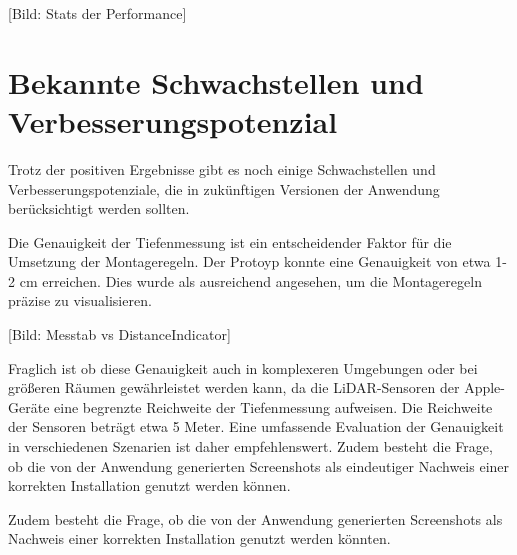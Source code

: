 [Bild: Stats der Performance]

\section{Bekannte Schwachstellen und Verbesserungspotenzial}

Trotz der positiven Ergebnisse gibt es noch einige Schwachstellen und Verbesserungspotenziale, die in zukünftigen Versionen der Anwendung berücksichtigt werden sollten.

Die Genauigkeit der Tiefenmessung ist ein entscheidender Faktor für die Umsetzung der Montageregeln. Der Protoyp konnte eine Genauigkeit von etwa 1-2 cm erreichen. Dies wurde als ausreichend angesehen, um die Montageregeln präzise zu visualisieren. 

[Bild: Messtab vs DistanceIndicator]

Fraglich ist ob diese Genauigkeit auch in komplexeren Umgebungen oder bei größeren Räumen gewährleistet werden kann, da die LiDAR-Sensoren der Apple-Geräte eine begrenzte Reichweite der Tiefenmessung aufweisen. Die Reichweite der Sensoren beträgt etwa 5 Meter. Eine umfassende Evaluation der Genauigkeit in verschiedenen Szenarien ist daher empfehlenswert. Zudem besteht die Frage, ob die von der Anwendung generierten Screenshots als eindeutiger Nachweis einer korrekten Installation genutzt werden können. \cite{appledevdoc}

Zudem besteht die Frage, ob die von der Anwendung generierten Screenshots als Nachweis einer korrekten Installation genutzt werden könnten. 
